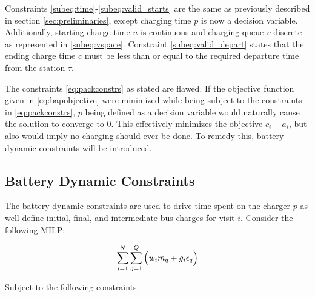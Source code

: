 \documentclass[letterpaper, 10pt, conference]{IEEEtran}
\begin{document}
Constraints \eqref{subeq:time}-\eqref{subeq:valid_starts} are the same as previously described in section \ref{sec:preliminaries}, except charging time \(p\) is now a decision variable. Additionally, starting charge time \(u\) is continuous and charging queue \(v\) discrete as represented in \eqref{subeq:vspace}. Constraint \eqref{subeq:valid_depart} states that the ending charge time \(c\) must be less than or equal to the required departure time from the station \(\tau\).

The constraints \eqref{eq:packconstrs} as stated are flawed. If the objective function given in \eqref{eq:bapobjective} were minimized while being subject to the constraints in \eqref{eq:packconstrs}, \(p\) being defined as a decision variable would naturally cause the solution to converge to 0. This effectively minimizes the objective \(c_i - a_i\), but also would imply no charging should ever be done. To remedy this, battery dynamic constraints will be introduced.

\subsection{Battery Dynamic Constraints}
The battery dynamic constraints are used to drive time spent on the charger \(p\) as well define initial, final, and intermediate bus charges for visit \(i\). Consider the following MILP:

\begin{equation}
\label{eq:objective}
    \sum_{i=1}^N \sum_{q=1}^Q \Big( w_i m_q + g_i \epsilon_q \Big) \\
\end{equation}

Subject to the following constraints:
\end{document}
